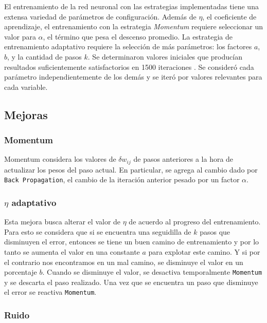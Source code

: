 \documentclass[a4paper,10pt]{article}
\begin{document}
        \label{sec:configuracion}
        El entrenamiento de la red neuronal con las estrategias implementadas tiene una extensa variedad de parámetros de configuración. Además de $\eta$, 
        el coeficiente de aprendizaje, el entrenamiento con la estrategia \textit{Momentum} requiere seleccionar un valor para $\alpha$, el término que pesa el descenso promedio. 
        La estrategia de entrenamiento adaptativo requiere la selección de más parámetros: los factores $a$, $b$, y la cantidad de pasos $k$.
        Se determinaron valores iniciales que producían resultados suficientemente satisfactorios en 1500 iteraciones . Se consideró cada parámetro independientemente de 
        los demás y se iteró por valores relevantes para cada variable.

    \subsection{Mejoras}

        \subsubsection{Momentum}

        Momentum considera los valores de $\delta w_{ij}$ de pasos anteriores a la hora de actualizar los pesos del paso actual.
        En particular, se agrega al cambio dado por \texttt{Back Propagation}, el cambio de la iteración anterior pesado por un factor $\alpha$.

        \subsubsection{$\eta$ adaptativo}

        Esta mejora busca alterar el valor de $\eta$ de acuerdo al progreso del entrenamiento.
        Para esto se considera que si se encuentra una seguidilla de $k$ pasos que disminuyen el error, entonces se tiene un buen camino de entrenamiento y por lo tanto se aumenta 
        el valor en una constante $a$ para explotar este camino. Y si por el contrario nos encontramos en un mal camino, se disminuye el valor en un porcentaje $b$.
        Cuando se disminuye el valor, se desactiva temporalmente \texttt{Momentum} y se descarta el paso realizado.
        Una vez que se encuentra un paso que disminuye el error se reactiva \texttt{Momentum}.

        \subsubsection{Ruido}
\end{document}
